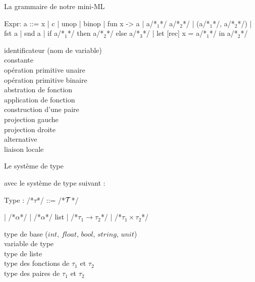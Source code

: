 \documentclass[xcolor={table,dvipsnames}]{beamer}
\begin{document}
\begin{frame}[fragile]{La grammaire de notre mini-ML}
 \begin{multicols}{2}
\begin{OCaml}
Expr: a ::= x
 | c
 | unop
 | binop
 | fun x -> a 
 | a/*$_1$*/ a/*$_2$*/ 
 | (a/*$_1$*/, a/*$_2$*/)
 | fst a
 | snd a
 | if a/*$_1$*/ then a/*$_2$*/ else a/*$_3$*/
 | let [rec] x = a/*$_1$*/ in a/*$_2$*/
\end{OCaml}
\noindent\small
identificateur (nom de variable)\\
constante\\
opération primitive unaire\\
opération primitive binaire\\
abstration de fonction\\
application de fonction\\
construction d'une paire\\
projection gauche\\
projection droite\\
alternative\\
liaison locale
\end{multicols}
\end{frame}













\begin{frame}[fragile]{Le système de type}

avec le système de type suivant :
\begin{multicols}{2}
\begin{OCaml}
Type : /*$\tau$*/ ::= /*$\cal{T}$*/

            | /*$\alpha$*/
            | /*$\alpha$*/ list
            | /*$\tau_1 \rightarrow \tau_2$*/
            | /*$\tau_1 \times \tau_2$*/

\end{OCaml}

\noindent
\small type de base ($int$, $float$, $bool$, $string$, $unit$)\\
variable de type\\
type de liste\\
type des fonctions de $\tau_1$ et $\tau_2$\\
type des paires de $\tau_1$ et $\tau_2$\\

\end{multicols}


\end{frame}
\end{document}
